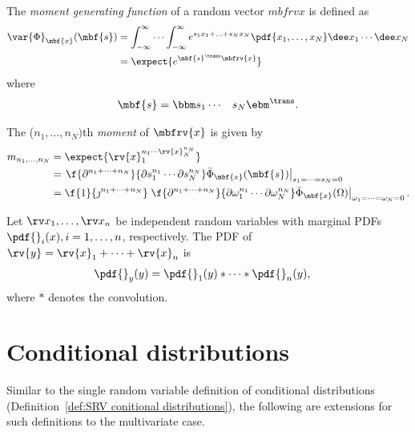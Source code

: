 \begin{definitionBox}
    The \emph{moment generating function} of a random vector $mbfrv{x}$ is defined as
    \begin{align}
        \var{\Phi}_{\mbf{x}}(\mbf{s}) &= \int_{-\infty}^{\infty}\cdots\int_{-\infty}^{\infty} e^{s_{1}x_{1}+\ldots+s_{N}x_{N}}\pdf{x_{1},\ldots,x_{N}}\dee x_{1}\cdots\dee x_{N}\\
        &= \expect{e^{\mbf{s}^{\trans}\mbfrv{x}}}
    \end{align}
    where
    \begin{align}
        \mbf{s} = \bbm s_{1} & \cdots & s_{N} \ebm^{\trans}.
    \end{align}
\end{definitionBox}



\begin{mytheorem}
       The ($n_{1},\ldots,n_{N})$th \emph{moment} of $\mbfrv{x}$ is given by
       \begin{align}
           m_{n_{1},\ldots,n_{N}} 
           &= \expect{\rv{x}_{1}^{n_{1}\cdots\rv{x}_{N}^{n_{N}}}}\\
           &= \left.\f{\partial^{n_{1}+\cdots+n_{N}}}{\partial s_{1}^{n_{1}}\cdots\partial s_{N}^{n_{N}}}\bar{\Phi}_{\mbf{x}}(\mbf{s})\right|_{s_{1}=\cdots=s_{N}=0}\\
           &=\f{1}{\jmath^{n_{1}+\cdots+n_{N}}} \left.\f{\partial^{n_{1}+\cdots+n_{N}}}{\partial \omega_{1}^{n_{1}}\cdots\partial \omega_{N}^{n_{N}}}\bar{\Phi}_{\mbf{x}}(\Omega)\right|_{\omega_{1}=\cdots=\omega_{N}=0}.
       \end{align}
\end{mytheorem}


\begin{mytheorem}
       Let $\stringRVs{x}{n}$ be independent random variables with marginal PDFs $\pdf{}_{i}(x), i=1,\ldots,n$, respectively. The PDF of $\rv{y}=\rv{x}_{1} + \cdots + \rv{x}_{n}$ is
       \begin{align}
           \pdf{}_{y}(y) &= \pdf{}_{1}(y)\ast\cdots\ast\pdf{}_{n}(y),
       \end{align}
       where $\ast$ denotes the convolution.
\end{mytheorem}



\section{Conditional distributions}
Similar to the single random variable definition of conditional distributions (Definition~\ref{def:SRV conitional distributions}), the following are extensions for such definitions to the multivariate case.

